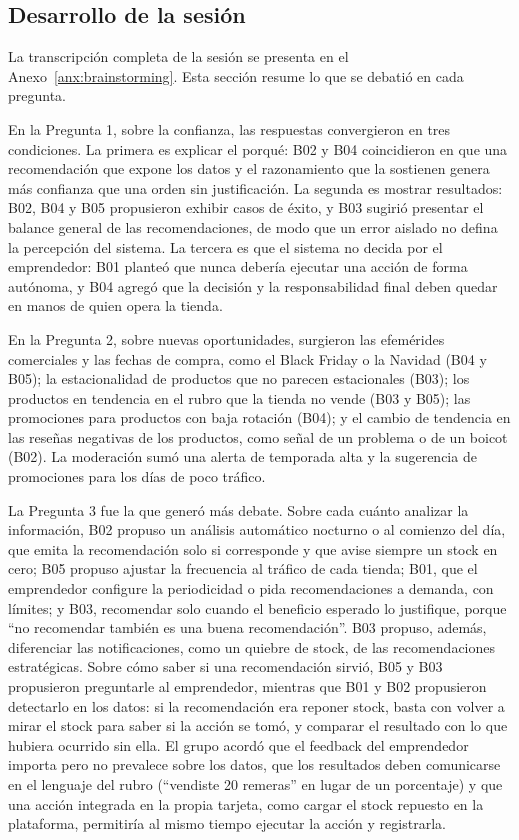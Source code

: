 \FloatBarrier

\subsection{Desarrollo de la sesión}
\label{sec:brainstorming-desarrollo}

La transcripción completa de la sesión se presenta en el Anexo~\ref{anx:brainstorming}. Esta sección resume lo que se debatió en cada pregunta.

En la Pregunta 1, sobre la confianza, las respuestas convergieron en tres condiciones. La primera es explicar el porqué: B02 y B04 coincidieron en que una recomendación que expone los datos y el razonamiento que la sostienen genera más confianza que una orden sin justificación. La segunda es mostrar resultados: B02, B04 y B05 propusieron exhibir casos de éxito, y B03 sugirió presentar el balance general de las recomendaciones, de modo que un error aislado no defina la percepción del sistema. La tercera es que el sistema no decida por el emprendedor: B01 planteó que nunca debería ejecutar una acción de forma autónoma, y B04 agregó que la decisión y la responsabilidad final deben quedar en manos de quien opera la tienda.

En la Pregunta 2, sobre nuevas oportunidades, surgieron las efemérides comerciales y las fechas de compra, como el Black Friday o la Navidad (B04 y B05); la estacionalidad de productos que no parecen estacionales (B03); los productos en tendencia en el rubro que la tienda no vende (B03 y B05); las promociones para productos con baja rotación (B04); y el cambio de tendencia en las reseñas negativas de los productos, como señal de un problema o de un boicot (B02). La moderación sumó una alerta de temporada alta y la sugerencia de promociones para los días de poco tráfico.

La Pregunta 3 fue la que generó más debate. Sobre cada cuánto analizar la información, B02 propuso un análisis automático nocturno o al comienzo del día, que emita la recomendación solo si corresponde y que avise siempre un stock en cero; B05 propuso ajustar la frecuencia al tráfico de cada tienda; B01, que el emprendedor configure la periodicidad o pida recomendaciones a demanda, con límites; y B03, recomendar solo cuando el beneficio esperado lo justifique, porque \enquote{no recomendar también es una buena recomendación}. B03 propuso, además, diferenciar las notificaciones, como un quiebre de stock, de las recomendaciones estratégicas. Sobre cómo saber si una recomendación sirvió, B05 y B03 propusieron preguntarle al emprendedor, mientras que B01 y B02 propusieron detectarlo en los datos: si la recomendación era reponer stock, basta con volver a mirar el stock para saber si la acción se tomó, y comparar el resultado con lo que hubiera ocurrido sin ella. El grupo acordó que el feedback del emprendedor importa pero no prevalece sobre los datos, que los resultados deben comunicarse en el lenguaje del rubro (\enquote{vendiste 20 remeras} en lugar de un porcentaje) y que una acción integrada en la propia tarjeta, como cargar el stock repuesto en la plataforma, permitiría al mismo tiempo ejecutar la acción y registrarla.


